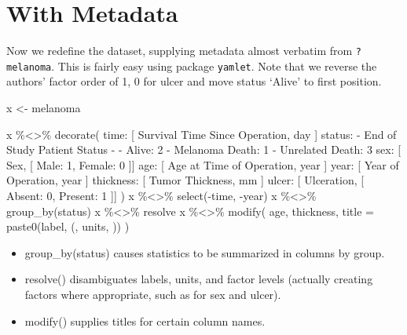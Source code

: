 \documentclass[
]{article}
\newenvironment{Shaded}{\begin{snugshade}}{\end{snugshade}}
\newcommand{\AttributeTok}[1]{\textcolor[rgb]{0.77,0.63,0.00}{#1}}
\newcommand{\FunctionTok}[1]{\textcolor[rgb]{0.00,0.00,0.00}{#1}}
\newcommand{\NormalTok}[1]{#1}
\newcommand{\OtherTok}[1]{\textcolor[rgb]{0.56,0.35,0.01}{#1}}
\newcommand{\SpecialCharTok}[1]{\textcolor[rgb]{0.00,0.00,0.00}{#1}}
\newcommand{\StringTok}[1]{\textcolor[rgb]{0.31,0.60,0.02}{#1}}
\begin{document}
\hypertarget{with-metadata}{%
\section{With Metadata}\label{with-metadata}}

Now we redefine the dataset, supplying metadata almost verbatim from
\texttt{?melanoma}. This is fairly easy using package \texttt{yamlet}.
Note that we reverse the authors' factor order of 1, 0 for ulcer and
move status `Alive' to first position.

\begin{Shaded}
\begin{Highlighting}[]
\NormalTok{x }\OtherTok{\textless{}{-}}\NormalTok{ melanoma}

\NormalTok{x }\SpecialCharTok{\%\textless{}\textgreater{}\%} \FunctionTok{decorate}\NormalTok{(}\StringTok{\textquotesingle{}}
\StringTok{time:      [ Survival Time Since Operation, day ]}
\StringTok{status:}
\StringTok{ {-} End of Study Patient Status}
\StringTok{ {-}}
\StringTok{  {-} Alive: 2}
\StringTok{  {-} Melanoma Death: 1}
\StringTok{  {-} Unrelated Death: 3}
\StringTok{sex:       [ Sex, [ Male: 1, Female: 0 ]]}
\StringTok{age:       [ Age at Time of Operation, year ]}
\StringTok{year:      [ Year of Operation, year ]}
\StringTok{thickness: [ Tumor Thickness, mm ]}
\StringTok{ulcer:     [ Ulceration, [ Absent: 0, Present: 1 ]]}
\StringTok{\textquotesingle{}}\NormalTok{)}
\NormalTok{x }\SpecialCharTok{\%\textless{}\textgreater{}\%} \FunctionTok{select}\NormalTok{(}\SpecialCharTok{{-}}\NormalTok{time, }\SpecialCharTok{{-}}\NormalTok{year)}
\NormalTok{x }\SpecialCharTok{\%\textless{}\textgreater{}\%} \FunctionTok{group\_by}\NormalTok{(status)}
\NormalTok{x }\SpecialCharTok{\%\textless{}\textgreater{}\%}\NormalTok{ resolve}
\NormalTok{x }\SpecialCharTok{\%\textless{}\textgreater{}\%} \FunctionTok{modify}\NormalTok{(}
\NormalTok{  age, thickness, }
  \AttributeTok{title =} \FunctionTok{paste0}\NormalTok{(label, }\StringTok{\textquotesingle{} (\textquotesingle{}}\NormalTok{, units, }\StringTok{\textquotesingle{})\textquotesingle{}}\NormalTok{)}
\NormalTok{)}
\end{Highlighting}
\end{Shaded}

\begin{itemize}
\item
  group\_by(status) causes statistics to be summarized in columns by
  group.
\item
  resolve() disambiguates labels, units, and factor levels (actually
  creating factors where appropriate, such as for sex and ulcer).
\item
  modify() supplies titles for certain column names.
\end{itemize}
\end{document}
